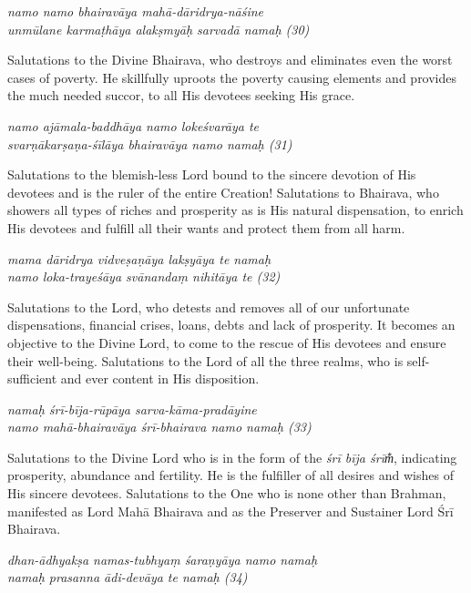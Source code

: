 \documentclass[12pt,oneside,a4paper]{article}
\newenvironment{shloka}[1]
  {\bigskip\center#1\varwidth{\linewidth}}
  {\endvarwidth\endcenter\bigskip}
\newcommand{\tl}[1]{\emph{#1}}
\begin{document}
\begin{shloka}\itshape
  namo namo bhairavāya mahā-dāridrya-nāśine\\
  unmūlane karmaṭhāya alakṣmyāḥ sarvadā namaḥ (30)
\end{shloka}

Salutations to the Divine Bhairava, who destroys and eliminates even the worst
cases of poverty. He skillfully uproots the poverty causing elements and
provides the much needed succor, to all His devotees seeking His grace.

\begin{shloka}\itshape
  namo ajāmala-baddhāya namo lokeśvarāya te\\
  svarṇākarṣaṇa-śīlāya bhairavāya namo namaḥ (31)
\end{shloka}

Salutations to the blemish-less Lord bound to the sincere devotion of His
devotees and is the ruler of the entire Creation! Salutations to Bhairava, who
showers all types of riches and prosperity as is His natural dispensation,
to enrich His devotees and fulfill all their wants and protect them from
all harm.

\begin{shloka}\itshape
  mama dāridrya vidveṣaṇāya lakṣyāya te namaḥ\\
  namo loka-trayeśāya svānandaṃ nihitāya te (32)
\end{shloka}

Salutations to the Lord, who detests and removes all of our unfortunate
dispensations, financial crises, loans, debts and lack of prosperity. It becomes
an objective to the Divine Lord, to come to the rescue of His devotees and
ensure their well-being. Salutations to the Lord of all the three realms, who is
self-sufficient and ever content in His disposition.

\begin{shloka}\itshape
  namaḥ śrī-bīja-rūpāya sarva-kāma-pradāyine\\
  namo mahā-bhairavāya śrī-bhairava namo namaḥ (33)
\end{shloka}

Salutations to the Divine Lord who is in the form of the \tl{śrī bīja śrīm̐},
indicating prosperity, abundance and fertility. He is the fulfiller of all
desires and wishes of His sincere devotees. Salutations to the One who is none
other than Brahman, manifested as Lord Mahā Bhairava and as the Preserver and
Sustainer Lord Śrī Bhairava.

\begin{shloka}\itshape
  dhan-ādhyakṣa namas-tubhyaṃ śaraṇyāya namo namaḥ\\
  namaḥ prasanna ādi-devāya te namaḥ (34)
\end{shloka}
\end{document}
